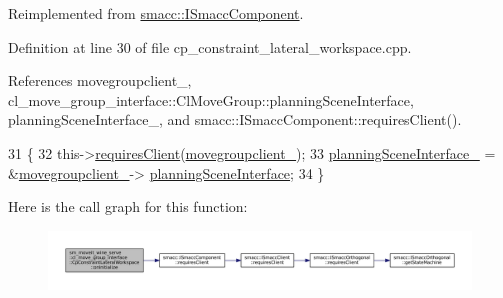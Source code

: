 Reimplemented from \hyperlink{classsmacc_1_1ISmaccComponent_ae6f71d008db12553912e9436184b9e65}{smacc\+::\+I\+Smacc\+Component}.



Definition at line 30 of file cp\+\_\+constraint\+\_\+lateral\+\_\+workspace.\+cpp.



References movegroupclient\+\_\+, cl\+\_\+move\+\_\+group\+\_\+interface\+::\+Cl\+Move\+Group\+::planning\+Scene\+Interface, planning\+Scene\+Interface\+\_\+, and smacc\+::\+I\+Smacc\+Component\+::requires\+Client().


\begin{DoxyCode}
31         \{
32             this->\hyperlink{classsmacc_1_1ISmaccComponent_a36c085d906fbae0fcaee817aaeafebf4}{requiresClient}(\hyperlink{classsm__moveit__wine__serve_1_1cl__move__group__interface_1_1CpConstraintLateralWorkspace_a5f0b2ff976bea0b0aeb83490ec66ae41}{movegroupclient\_});
33             \hyperlink{classsm__moveit__wine__serve_1_1cl__move__group__interface_1_1CpConstraintLateralWorkspace_a28bd199cdd66872426a278dd8847f780}{planningSceneInterface\_} = &\hyperlink{classsm__moveit__wine__serve_1_1cl__move__group__interface_1_1CpConstraintLateralWorkspace_a5f0b2ff976bea0b0aeb83490ec66ae41}{movegroupclient\_}->
      \hyperlink{classcl__move__group__interface_1_1ClMoveGroup_a11bfab580f36e2ad32c9b37d6f58f44c}{planningSceneInterface};
34         \}
\end{DoxyCode}
Here is the call graph for this function\+:
\nopagebreak
\begin{figure}[H]
\begin{center}
\leavevmode
\includegraphics[width=350pt]{classsm__moveit__wine__serve_1_1cl__move__group__interface_1_1CpConstraintLateralWorkspace_ab9fdca51abefbd7f99a4f9e858e3db7f_cgraph}
\end{center}
\end{figure}
\mbox{\label{classsm__moveit__wine__serve_1_1cl__move__group__interface_1_1CpConstraintLateralWorkspace_a76692ba49429efb9e704cd8fdcf6ec0b}} 
